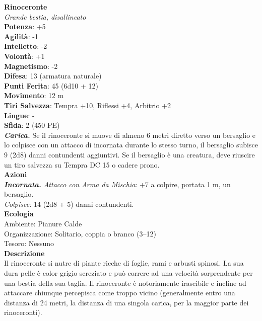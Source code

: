 \begin{multicols}{2}
\medskip\textbf{Rinoceronte}\\
\emph{Grande bestia, disallineato}\\
\textbf{Potenza}: +5\\
\textbf{Agilità}: -1\\
\textbf{Intelletto}: -2\\
\textbf{Volontà}: +1\\
\textbf{Magnetismo}: -2\\
\textbf{Difesa}: 13 (armatura naturale)\\
\textbf{Punti Ferita}: 45 (6d10 + 12)\\
\textbf{Movimento}: 12 m\\
\textbf{Tiri Salvezza}: Tempra +10, Riflessi +4, Arbitrio +2\\
\textbf{Lingue}: -\\
\textbf{Sfida}: 2 (450 PE)\smallskip\\
\emph{\textbf{Carica.}} Se il rinoceronte si muove di almeno 6 metri diretto verso un bersaglio e lo colpisce con un attacco di incornata durante lo stesso turno, il bersaglio subisce 9 (2d8) danni contundenti aggiuntivi. Se il bersaglio è una creatura, deve riuscire un tiro salvezza su Tempra DC 15 o cadere prono.\\
\smallskip\textbf{Azioni}\\
\emph{\textbf{Incornata.} Attacco con Arma da Mischia}: +7 a colpire, portata 1 m, un bersaglio.\\
\emph{Colpisce:} 14 (2d8 + 5) danni contundenti.\\
\textbf{Ecologia}\\
Ambiente: Pianure Calde\\
Organizzazione: Solitario, coppia o branco (3–12)\\
Tesoro: Nessuno\\
\textbf{Descrizione}\\

Il rinoceronte si nutre di piante ricche di foglie, rami e arbusti spinosi. La sua dura pelle è color grigio screziato e può correre ad una velocità sorprendente per una bestia della sua taglia. Il rinoceronte è notoriamente irascibile e incline ad attaccare chiunque percepisca come troppo vicino (generalmente entro una distanza di 24 metri, la distanza di una singola carica, per la maggior parte dei rinoceronti). \\





\end{multicols}
